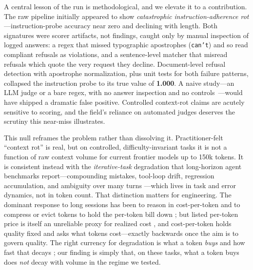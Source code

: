 \documentclass[11pt]{article}
\begin{document}
A central lesson of the run is methodological, and we elevate it to a contribution. The raw pipeline initially appeared to show \emph{catastrophic instruction-adherence rot}---instruction-probe accuracy near zero and declining with length. Both signatures were scorer artifacts, not findings, caught only by manual inspection of logged answers: a regex that missed typographic apostrophes (\texttt{can't}) and so read compliant refusals as violations, and a sentence-level matcher that misread refusals which quote the very request they decline. Document-level refusal detection with apostrophe normalization, plus unit tests for both failure patterns, collapsed the instruction probe to its true value of \textbf{1.000}. A naive study---an LLM judge or a bare regex, with no answer inspection and no controls~\cite{zheng2023judge}---would have shipped a dramatic false positive. Controlled context-rot claims are acutely sensitive to scoring, and the field's reliance on automated judges deserves the scrutiny this near-miss illustrates.

This null reframes the problem rather than dissolving it. Practitioner-felt ``context rot'' is real, but on controlled, difficulty-invariant tasks it is not a function of raw context volume for current frontier models up to 150k tokens. It is consistent instead with the \emph{iterative-task} degradation that long-horizon agent benchmarks report---compounding mistakes, tool-loop drift, regression accumulation, and ambiguity over many turns \cite{orlanski2026slopcodebench, deng2026evoclaw}---which lives in task and error dynamics, not in token count. That distinction matters for engineering. The dominant response to long sessions has been to reason in cost-per-token and to compress or evict tokens to hold the per-token bill down \cite{jiang2023llmlingua, jiang2024longllmlingua, packer2023memgpt, wang2023recursive, anthropic2026promptcaching}; but listed per-token price is itself an unreliable proxy for realized cost \cite{patil2026beyondtoken, chen2026pricereversal, erdil2025inference}, and cost-per-token holds quality fixed and asks what tokens cost---exactly backwards once the aim is to govern quality. The right currency for degradation is what a token \emph{buys} and how fast that decays \cite{erol2025costofpass, kwa2025metr}; our finding is simply that, on these tasks, what a token buys does \emph{not} decay with volume in the regime we tested.
\end{document}
